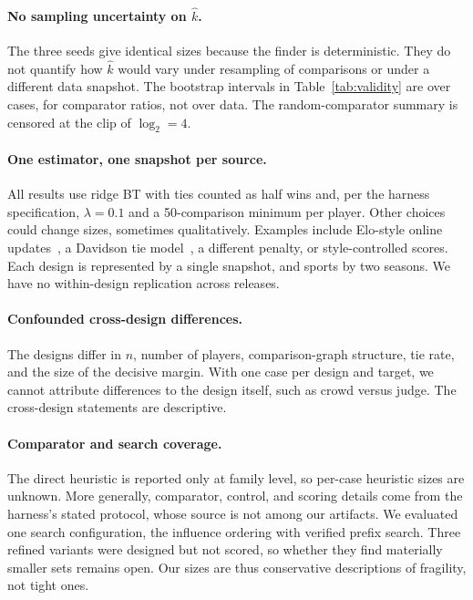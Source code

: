 \documentclass{article}
\newcommand{\kver}{\hat{k}}
\begin{document}
\paragraph{No sampling uncertainty on $\kver$.}
The three seeds give identical sizes because the finder is deterministic. They do not quantify how $\kver$ would vary under resampling of comparisons or under a different data snapshot. The bootstrap intervals in Table~\ref{tab:validity} are over cases, for comparator ratios, not over data. The random-comparator summary is censored at the clip of $\log_2=4$.

\paragraph{One estimator, one snapshot per source.}
All results use ridge BT with ties counted as half wins and, per the harness specification, $\lambda=0.1$ and a 50-comparison minimum per player. Other choices could change sizes, sometimes qualitatively. Examples include Elo-style online updates~\citep{Boubdir2023EloUR}, a Davidson tie model~\citep{Davidson1970OnET}, a different penalty, or style-controlled scores. Each design is represented by a single snapshot, and sports by two seasons. We have no within-design replication across releases.

\paragraph{Confounded cross-design differences.}
The designs differ in $n$, number of players, comparison-graph structure, tie rate, and the size of the decisive margin. With one case per design and target, we cannot attribute differences to the design itself, such as crowd versus judge. The cross-design statements are descriptive.

\paragraph{Comparator and search coverage.}
The direct heuristic is reported only at family level, so per-case heuristic sizes are unknown. More generally, comparator, control, and scoring details come from the harness's stated protocol, whose source is not among our artifacts. We evaluated one search configuration, the influence ordering with verified prefix search. Three refined variants were designed but not scored, so whether they find materially smaller sets remains open. Our sizes are thus conservative descriptions of fragility, not tight ones.
\end{document}
